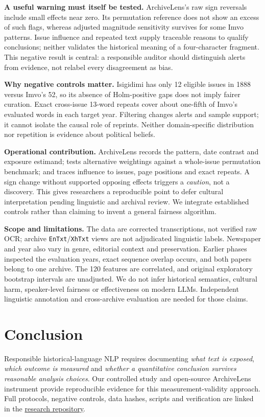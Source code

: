 \documentclass[10pt,letterpaper]{article}
\begin{document}
\textbf{A useful warning must itself be tested.} ArchiveLens's raw sign reversals include small effects near zero. Its permutation reference does not show an excess of such flags, whereas adjusted magnitude sensitivity survives for some Imvo patterns. Issue influence and repeated text supply traceable reasons to qualify conclusions; neither validates the historical meaning of a four-character fragment. This negative result is central: a responsible auditor should distinguish alerts from evidence, not relabel every disagreement as bias.

\textbf{Why negative controls matter.} Isigidimi has only 12 eligible issues in 1888 versus Imvo's 52, so its absence of Holm-positive gaps does not imply fairer curation. Exact cross-issue 13-word repeats cover about one-fifth of Imvo's evaluated words in each target year. Filtering changes alerts and sample support; it cannot isolate the causal role of reprints. Neither domain-specific distribution nor repetition is evidence about political beliefs.\par

\textbf{Operational contribution.} ArchiveLens records the pattern, date contrast and exposure estimand; tests alternative weightings against a whole-issue permutation benchmark; and traces influence to issues, page positions and exact repeats. A sign change without supported opposing effects triggers a \emph{caution}, not a discovery. This gives researchers a reproducible point to defer cultural interpretation pending linguistic and archival review. We integrate established controls rather than claiming to invent a general fairness algorithm.\par

\textbf{Scope and limitations.} The data are corrected transcriptions, not verified raw OCR; archive \texttt{EnTxt}/\texttt{XhTxt} views are not adjudicated linguistic labels. Newspaper and year also vary in genre, editorial context and preservation. Earlier phases inspected the evaluation years, exact sequence overlap occurs, and both papers belong to one archive. The 120 features are correlated, and original exploratory bootstrap intervals are unadjusted. We do not infer historical semantics, cultural harm, speaker-level fairness or effectiveness on modern LLMs. Independent linguistic annotation and cross-archive evaluation are needed for those claims.

\section{Conclusion}
Responsible historical-language NLP requires documenting \emph{what text is exposed}, \emph{which outcome is measured} and \emph{whether a quantitative conclusion survives reasonable analysis choices}. Our controlled study and open-source ArchiveLens instrument provide reproducible evidence for this measurement-validity approach. Full protocols, negative controls, data hashes, scripts and verification are linked in the \href{https://github.com/Stralb/isixhosa-archive-nlp}{research repository}.
\end{document}
